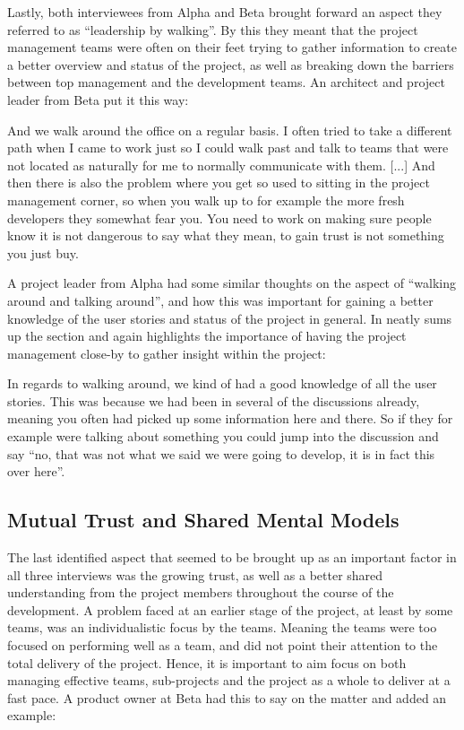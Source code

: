 Lastly, both interviewees from Alpha and Beta brought forward an aspect they referred to as ``leadership by walking''. By this they meant that the project management teams were often on their feet trying to gather information to create a better overview and status of the project, as well as breaking down the barriers between top management and the development teams. An architect and project leader from Beta put it this way:

\begin{fancyquotes}
And we walk around the office on a regular basis. I often tried to take a different path when I came to work just so I could walk past and talk to teams that were not located as naturally for me to normally communicate with them. [...] And then there is also the problem where you get so used to sitting in the project management corner, so when you walk up to for example the more fresh developers they somewhat fear you. You need to work on making sure people know it is not dangerous to say what they mean, to gain trust is not something you just buy.
\end{fancyquotes}

A project leader from Alpha had some similar thoughts on the aspect of ``walking around and talking around'', and how this was important for gaining a better knowledge of the user stories and status of the project in general. In neatly sums up the section and again highlights the importance of having the project management close-by to gather insight within the project:

\begin{fancyquotes}
In regards to walking around, we kind of had a good knowledge of all the user stories. This was because we had been in several of the discussions already, meaning you often had picked up some information here and there. So if they for example were talking about something you could jump into the discussion and say ``no, that was not what we said we were going to develop, it is in fact this over here''.
\end{fancyquotes}

\subsection{Mutual Trust and Shared Mental Models}

The last identified aspect that seemed to be brought up as an important factor in all three interviews was the growing trust, as well as a better shared understanding from the project members throughout the course of the development. A problem faced at an earlier stage of the project, at least by some teams, was an individualistic focus by the teams. Meaning the teams were too focused on performing well as a team, and did not point their attention to the total delivery of the project. Hence, it is important to aim focus on both managing effective teams, sub-projects and the project as a whole to deliver at a fast pace. A product owner at Beta had this to say on the matter and added an example:

